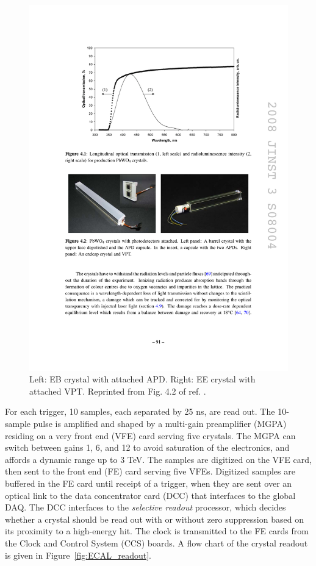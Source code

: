 \documentclass[dissertation.tex]{subfiles}
\begin{document}
\begin{figure}
	\centering
	\includegraphics[scale=1.0]{ECAL_crystals}
	\caption{Left: EB crystal with attached APD.  Right: EE crystal with attached VPT.  Reprinted from Fig. 4.2 of ref. \cite{1748-0221-3-08-S08004}.}
	\label{fig:ECAL_crystals}
\end{figure}

For each trigger, 10 samples, each separated by 25 ns, are read out.  The 10-sample pulse is amplified and shaped by a multi-gain preamplifier (MGPA) residing on a very front end (VFE) card serving five crystals.  The MGPA can switch between gains 1, 6, and 12 to avoid saturation of the electronics, and affords a dynamic range up to 3 TeV.  The samples are digitized on the VFE card, then sent to the front end (FE) card serving five VFEs.  Digitized samples are buffered in the FE card until receipt of a trigger, when they are sent over an optical link to the data concentrator card (DCC) that interfaces to the global DAQ.  The DCC interfaces to the \textit{selective readout} processor, which decides whether a crystal should be read out with or without zero suppression based on its proximity to a high-energy hit.  The clock is transmitted to the FE cards from the Clock and Control System (CCS) boards.  A flow chart of the crystal readout is given in Figure~\ref{fig:ECAL_readout}.
\end{document}
